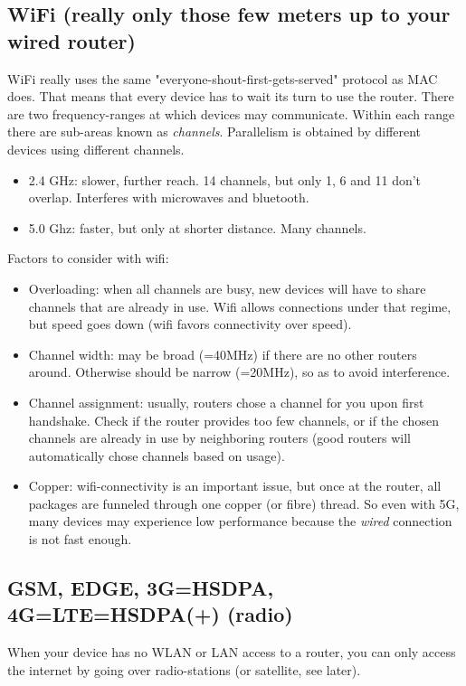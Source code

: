 \subsection{WiFi (really only those few meters up to your wired router)}
WiFi really uses the same "everyone-shout-first-gets-served" protocol as MAC does. That means that every device has to wait its turn to use the router. 
There are two frequency-ranges at which devices may communicate. Within each range there are sub-areas known as \emph{channels}. Parallelism is obtained by different devices using different channels. 
\begin{itemize}
    \item 2.4 GHz: slower, further reach. 14 channels, but only 1, 6 and 11 don't overlap. Interferes with microwaves and bluetooth.
    \item 5.0 Ghz: faster, but only at shorter distance. Many channels.
\end{itemize}
Factors to consider with wifi:
\begin{itemize}
    \item Overloading: when all channels are busy, new devices will have to share channels that are already in use. Wifi allows connections under that regime, but speed goes down (wifi favors connectivity over speed). 
    \item Channel width: may be broad (=40MHz) if there are no other routers around. Otherwise should be narrow (=20MHz), so as to avoid interference.
    \item Channel assignment: usually, routers chose a channel for you upon first handshake. Check if the router provides too few channels, or if the chosen channels are already in use by neighboring routers (good routers will automatically chose channels based on usage). 
    \item Copper: wifi-connectivity is an important issue, but once at the router, all packages are funneled through one copper (or fibre) thread. So even with 5G, many devices may experience low performance because the \emph{wired} connection is not fast enough.
\end{itemize}


\subsection{GSM, EDGE, 3G=HSDPA, 4G=LTE=HSDPA(+) (radio)}
When your device has no WLAN or LAN access to a router, you can only access the internet by going over radio-stations (or satellite, see later). 


